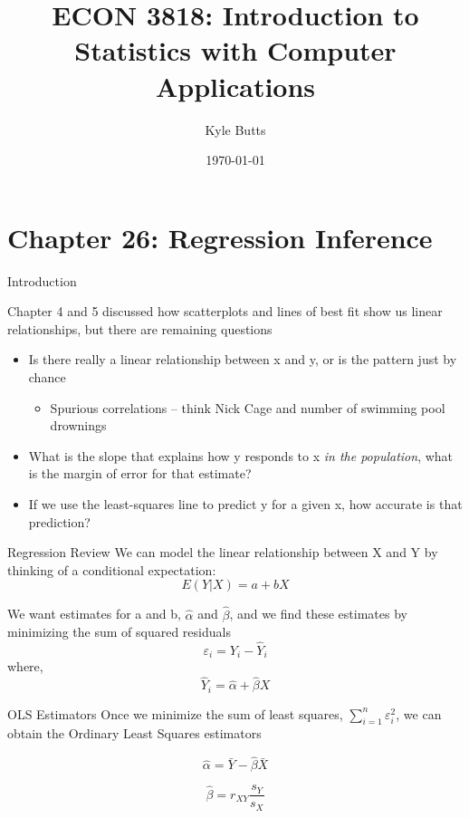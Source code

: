 \documentclass{beamer}
\title{ECON 3818: Introduction to Statistics with Computer Applications}
\date{\today}
\author{Kyle Butts}
\begin{document}
\maketitle


\section{Chapter 26: Regression Inference}

\begin{frame}{Introduction}
	
	Chapter 4 and 5 discussed how scatterplots and lines of best fit show us linear relationships, but there are remaining questions

	\begin{itemize}
		\item Is there really a linear relationship between x and y, or is the pattern just by chance
			\begin{itemize}
		      	\item Spurious correlations -- think Nick Cage and number of swimming pool drownings
			\end{itemize}
			  
		\item What is the slope that explains how y responds to x \textit{in the population}, what is the margin of error for that estimate?
		
		\item If we use the least-squares line to predict y for a given x, how accurate is that prediction?
	\end{itemize}
	
\end{frame}

\begin{frame}{Regression Review}
	We can model the linear relationship between X and Y by thinking of a conditional expectation: \[ 
		E(Y|X)= a + bX 
	\]
	
	We want estimates for a and b, $\hat{\alpha}$ and $\hat{\beta}$, and we find these estimates by minimizing the sum of squared residuals
	\[ 
		\varepsilon_i = Y_i - \widehat{Y}_i 
	\]
	where,
	\[ 
		\widehat{Y}_i = \hat{\alpha} +  \hat{\beta} X 
	\]
\end{frame}

\begin{frame}{OLS Estimators}
	Once we minimize the sum of least squares, $\displaystyle\sum_{i=1}^n \varepsilon_i^2 $, we can obtain the Ordinary Least Squares estimators
	
	\[ 
		\hat{\alpha}=\bar{Y}-\hat{\beta}\bar{X} 
	\]
	
	\[ 
		\hat{\beta}=r_{XY}\frac{s_Y}{s_X} 
	\]
\end{frame}
\end{document}
